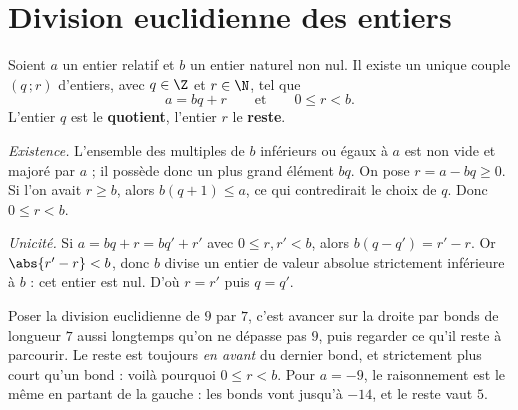 \section{Division euclidienne des entiers}

\begin{theoreme}
Soient $a$ un entier relatif et $b$ un entier naturel non nul. Il existe un
unique couple $(q\,;r)$ d'entiers, avec $q \in \Z$ et $r \in \N$, tel que
\[
  a = bq+r \qquad \text{et} \qquad 0 \leq r < b .
\]
L'entier $q$ est le \textbf{quotient}, l'entier $r$ le \textbf{reste}.
\end{theoreme}

\begin{demonstration}
\emph{Existence.} L'ensemble des multiples de $b$ inférieurs ou égaux à $a$
est non vide et majoré par $a$ ; il possède donc un plus grand élément $bq$.
On pose $r = a-bq \geq 0$. Si l'on avait $r \geq b$, alors $b(q+1) \leq a$,
ce qui contredirait le choix de $q$. Donc $0 \leq r < b$.

\smallskip
\emph{Unicité.} Si $a = bq+r = bq'+r'$ avec $0 \leq r,r' < b$, alors
$b(q-q') = r'-r$. Or $\abs{r'-r} < b$, donc $b$ divise un entier de valeur
absolue strictement inférieure à $b$ : cet entier est nul. D'où $r = r'$ puis
$q = q'$.
\end{demonstration}

\begin{visualisation}
\begin{center}
\end{center}

Poser la division euclidienne de $9$ par $7$, c'est avancer sur la droite par
bonds de longueur $7$ aussi longtemps qu'on ne dépasse pas $9$, puis regarder
ce qu'il reste à parcourir. Le reste est toujours \emph{en avant} du dernier
bond, et strictement plus court qu'un bond : voilà pourquoi
$0 \leq r < b$. Pour $a = -9$, le raisonnement est le même en partant de la
gauche : les bonds vont jusqu'à $-14$, et le reste vaut $5$.
\end{visualisation}

